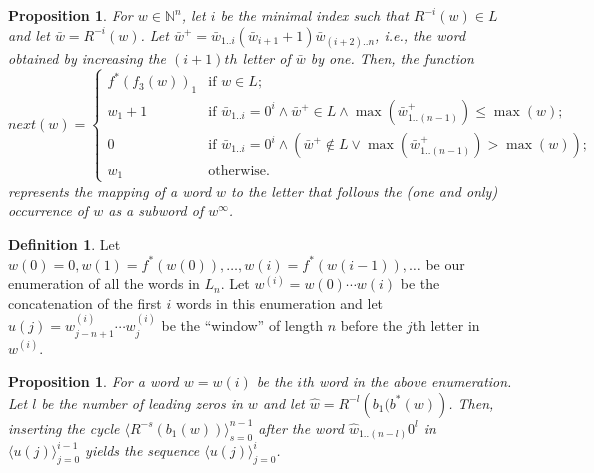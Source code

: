 \documentclass{article}
\newtheorem{proposition}[theorem]{Proposition}
\theoremstyle{definition}
\newtheorem{definition}{Definition}
\newcommand{\N}{{\mathbb{N}}}
\newcommand{\T}[1]{\langle{#1}\rangle}
\newcommand{\rl}[2]{R^{-{#2}}({#1})}
\begin{document}
\begin{proposition}
	For $w \in \N^n$, let $i$ be the minimal index such that $\rl{w}{i} \in L$ and let $\bar{w}=\rl{w}{i}$. Let $\bar{w}^+=\bar{w}_{1..i}(\bar{w}_{i+1}+1)\bar{w}_{(i+2)..n}$, i.e., the word obtained by increasing the $(i+1)th$ letter of $\bar{w}$ by one.  Then, the function
	$$next(w)=
	\begin{cases}
	f^*(f_3(w))_1 & \text{if } w \in L; \\
	w_1+1         & \text{if }\bar{w}_{1..i}= 0^i \wedge \bar{w}^+ \in L\wedge \max{(\bar{w}^+_{1..(n-1)})} \leq \max(w); \\
	0             & \text{if }\bar{w}_{1..i}= 0^i \wedge (\bar{w}^+ \notin L \vee \max{(\bar{w}^+_{1..(n-1)})} > \max(w)); \\
	w_1           & \text{otherwise.}
	\end{cases}$$
	represents the mapping of a word $w$ to the letter that follows the (one and only) occurrence of $w$ as a subword of $w^\infty$.
\end{proposition}

\begin{definition}
	Let $w(0)=0, w(1)=f^*(w(0)),\dots,w(i)=f^*(w{(i-1)}),\dots$ be our enumeration of all the words in $L_n$. Let $w^{(i)}=w(0)\cdots w(i)$ be the concatenation of the first $i$ words in this enumeration and let $u(j)=w^{(i)}_{j-n+1}\cdots w^{(i)}_j$ be the ``window'' of length $n$ before the $j$th letter in $w^{(i)}$.
\end{definition}

\begin{proposition}
	For a word $w=w(i)$ be the $i$th word in the above enumeration. Let $l$ be the number of leading zeros in $w$ and let $\hat{w}=\rl{b_1(b^*(w)}{l}$. Then, inserting the cycle $\T{\rl{b_1(w)}{s}}_{s=0}^{n-1}$ after the word $\hat{w}_{1..(n-l)}0^l$ in $\T{u(j)}_{j=0}^{i-1}$ yields the sequence $\T{u(j)}_{j=0}^{i}$.
\end{proposition}		
	
		
\end{document}
